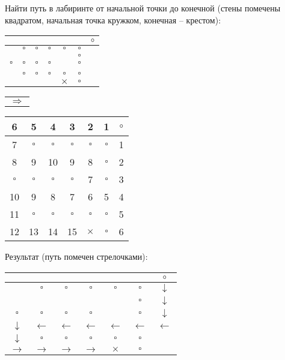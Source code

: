 \documentclass[russian]{lecture-notes}
\begin{document}
	\begin{problem}[пример]
		Найти путь в лабиринте от начальной точки до конечной (стены помечены квадратом, начальная точка кружком, конечная -- крестом):
		\begin{center}
			\begin{tabular}{||c|c|c|c|c|c|c||}
				\hline\hline &&&&&&$\circ$\\\hline
				&$\square$&$\square$&$\square$&$\square$&$\square$&\\\hline
				&&&&&$\square$&\\\hline
				$\square$&$\square$&$\square$&$\square$&&$\square$&\\\hline
				&&&&&&\\\hline
				&$\square$&$\square$&$\square$&$\square$&$\square$&\\\hline
				&&&&$\times$&$\square$&\\
				\hline \hline
			\end{tabular}
			\begin{tabular}{c}
				$\Rightarrow$\\
			\end{tabular}
			\begin{tabular}{||c|c|c|c|c|c|c||}
				\hline\hline 6&5&4&3&2&1&$\circ$\\\hline
				7&$\square$&$\square$&$\square$&$\square$&$\square$&1\\\hline
				8&9&10&9&8&$\square$&2\\\hline
				$\square$&$\square$&$\square$&$\square$&7&$\square$&3\\\hline
				10&9&8&7&6&5&4\\\hline
				11&$\square$&$\square$&$\square$&$\square$&$\square$&5\\\hline
				12&13&14&15&$\times$&$\square$&6\\
				\hline \hline
			\end{tabular}
		\end{center}
		Результат (путь помечен стрелочками):
		\begin{center}
			\begin{tabular}{||c|c|c|c|c|c|c||}
				\hline\hline &&&&&&$\circ$\\\hline
				&$\square$&$\square$&$\square$&$\square$&$\square$&$\downarrow$\\\hline
				&&&&&$\square$&$\downarrow$\\\hline
				$\square$&$\square$&$\square$&$\square$&&$\square$&$\downarrow$\\\hline
				$\downarrow$&$\leftarrow$&$\leftarrow$&$\leftarrow$&$\leftarrow$&$\leftarrow$&$\leftarrow$\\\hline
				$\downarrow$&$\square$&$\square$&$\square$&$\square$&$\square$&\\\hline
				$\rightarrow$&$\rightarrow$&$\rightarrow$&$\rightarrow$&$\times$&$\square$&\\
				\hline \hline
			\end{tabular}
		\end{center}
	\end{problem}
	
\end{document}

